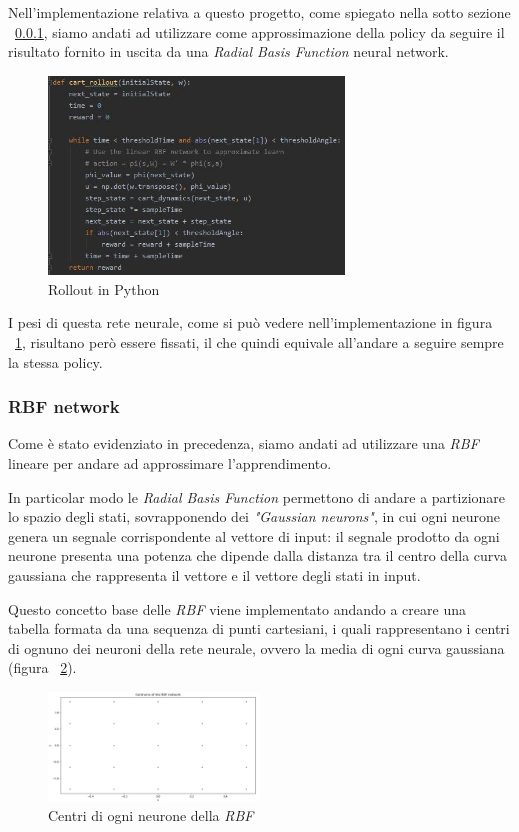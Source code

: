 Nell'implementazione relativa a questo progetto, come spiegato nella sotto sezione ~\ref{sec:RBF}, siamo andati ad utilizzare come approssimazione della policy da seguire il risultato fornito in uscita da una \textit{Radial Basis Function} neural network. 

\begin{figure}[!h]
	\centering
	\includegraphics[width=0.7\textwidth]{Immagini/Rollout.JPG}
	\caption{Rollout in Python}
	\label{fig:roll_py}
\end{figure}

I pesi di questa rete neurale, come si può vedere nell'implementazione in figura ~\ref{fig:roll_py}, risultano però essere fissati, il che quindi equivale all'andare a seguire sempre la stessa policy.
\subsubsection{RBF network}
\label{sec:RBF}
Come è stato evidenziato in precedenza, siamo andati ad utilizzare una \textit{RBF} lineare per andare ad approssimare l'apprendimento.

In particolar modo le \textit{Radial Basis Function} permettono di andare a partizionare lo spazio degli stati, sovrapponendo dei \textit{"Gaussian neurons"}, in cui ogni neurone genera un segnale corrispondente al vettore di input: il segnale prodotto da ogni neurone presenta una potenza che dipende dalla distanza tra il centro della curva gaussiana che rappresenta il vettore e il vettore degli stati in input.

Questo concetto base delle \textit{RBF} viene implementato andando a creare una tabella formata da una sequenza di punti cartesiani, i quali rappresentano i centri di ognuno dei neuroni della rete neurale, ovvero la media di ogni curva gaussiana (figura ~\ref{fig:RBF_Centrum}).

\begin{figure}[!h]
	\centering
	\includegraphics[width=0.5\textwidth]{Immagini/Centrum_of_RBF.JPG}
	\caption{Centri di ogni neurone della \textit{RBF}}
	\label{fig:RBF_Centrum}
\end{figure}

